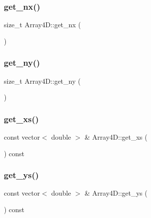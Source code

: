 \subsubsection{\texorpdfstring{get\+\_\+nx()}{get\_nx()}}
{\footnotesize\ttfamily size\+\_\+t Array4\+D\+::get\+\_\+nx (\begin{DoxyParamCaption}{ }\end{DoxyParamCaption})}

\mbox{\label{class_array4_d_a6f75a07d72213eff83aabbfd8442d1d3}} 
\subsubsection{\texorpdfstring{get\+\_\+ny()}{get\_ny()}}
{\footnotesize\ttfamily size\+\_\+t Array4\+D\+::get\+\_\+ny (\begin{DoxyParamCaption}{ }\end{DoxyParamCaption})}

\mbox{\label{class_array4_d_a5b72fa60e0feacd807d4d2e7bd1bf5fd}} 
\subsubsection{\texorpdfstring{get\+\_\+xs()}{get\_xs()}}
{\footnotesize\ttfamily const vector$<$ double $>$ \& Array4\+D\+::get\+\_\+xs (\begin{DoxyParamCaption}{ }\end{DoxyParamCaption}) const}

\mbox{\label{class_array4_d_a3f6fa1fc8bc07a3aa51cbdada40e25e7}} 
\subsubsection{\texorpdfstring{get\+\_\+ys()}{get\_ys()}}
{\footnotesize\ttfamily const vector$<$ double $>$ \& Array4\+D\+::get\+\_\+ys (\begin{DoxyParamCaption}{ }\end{DoxyParamCaption}) const}

\mbox{\label{class_array4_d_ac4d55dadfae71139e8d860fe171146c7}} 
